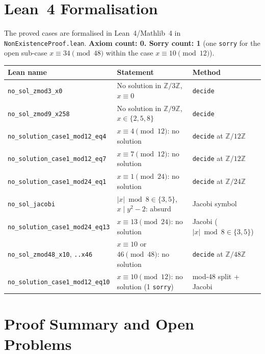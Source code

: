 \documentclass[12pt,a4paper]{article}
\theoremstyle{definition}
\newcommand{\Z}{\mathbb{Z}}
\begin{document}
\section{Lean~4 Formalisation}

The proved cases are formalised in Lean~4/Mathlib~4 in
\texttt{NonExistenceProof.lean}.  \textbf{Axiom count: 0.  Sorry count: 1}
(one \texttt{sorry} for the open sub-case $x\equiv 34\pmod{48}$
within the case $x\equiv 10\pmod{12}$).

\begin{center}
\begin{tabular}{lll}
\toprule
Lean name & Statement & Method \\
\midrule
\texttt{no\_sol\_zmod3\_x0}   & No solution in $\Z/3\Z$, $x \equiv 0$          & \texttt{decide} \\
\texttt{no\_sol\_zmod9\_x258} & No solution in $\Z/9\Z$, $x \in \{2,5,8\}$    & \texttt{decide} \\
\texttt{no\_solution\_case1\_mod12\_eq4}  & $x\equiv 4\pmod{12}$: no solution  & \texttt{decide} at $\Z/12\Z$ \\
\texttt{no\_solution\_case1\_mod12\_eq7}  & $x\equiv 7\pmod{12}$: no solution  & \texttt{decide} at $\Z/12\Z$ \\
\texttt{no\_solution\_case1\_mod24\_eq1}  & $x\equiv 1\pmod{24}$: no solution  & \texttt{decide} at $\Z/24\Z$ \\
\texttt{no\_sol\_jacobi}      & $|x|\bmod 8\in\{3,5\}$, $x\mid y^2-2$: absurd & Jacobi symbol \\
\texttt{no\_solution\_case1\_mod24\_eq13} & $x\equiv 13\pmod{24}$: no solution & Jacobi ($|x|\bmod 8\in\{3,5\}$) \\
\texttt{no\_sol\_zmod48\_x10}, \texttt{..x46} & $x\equiv 10$ or $46\pmod{48}$: no solution & \texttt{decide} at $\Z/48\Z$ \\
\texttt{no\_solution\_case1\_mod12\_eq10} & $x\equiv 10\pmod{12}$: no solution (1 \texttt{sorry}) & mod-48 split + Jacobi \\
\bottomrule
\end{tabular}
\end{center}

\section{Proof Summary and Open Problems}
\end{document}
